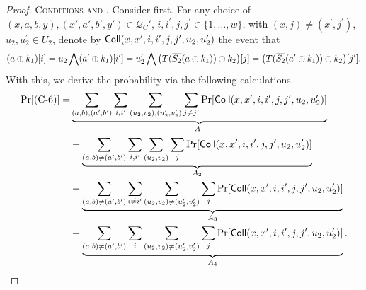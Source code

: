 \begin{proof}

%
%




\smallskip
\noindent\textsc{Conditions \csix and \cnine}. Consider \csix first. For any choice of $(x,a, b,y), (x',a', b',y') \in \mathcal{Q}_{C}'$, $i, i^{\prime},j, j^{\prime} \in\{1, \ldots, w\}$, with $(x, j) \neq \left(x^{\prime}, j^{\prime}\right)$, $u_{2}, u_{2}^{\prime} \in U_{2}$, denote by $\mathsf{Coll}(x,x',i,i',j,j',u_2,u_2')$ the event that
%
%
$$(a \oplus k_1)[i] = u_2\bigwedge(a' \oplus k_1)[i'] = u_2'\bigwedge\big(T(\overline{S_2}(a\oplus k_1))\oplus k_2\big)[j]=\big(T(\overline{S_2}(a'\oplus k_1))\oplus k_2\big)[j'].
$$
%
%
With this, we derive the probability via the following calculations.
%
%
\begin{align*}
\Pr[\text{(C-6)}]  
=   &  \underbrace{\sum_{(a,b),(a',b')}\sum_{i,i'}\sum_{(u_2,v_2),(u_2',v_2')}\sum_{j\neq j'}\Pr[\mathsf{Coll}(x,x',i,i',j,j',u_2,u_2')]}_{A_1}    \\
&  + \underbrace{\sum_{(a,b)\neq(a',b')}\sum_{i,i'}\sum_{(u_2,v_2)}\sum_{j}\Pr[\mathsf{Coll}(x,x',i,i',j,j',u_2,u_2')]}_{A_2}      \\
&  +  \underbrace{\sum_{(a,b)\neq(a',b')}\sum_{i\neq i'}\sum_{(u_2,v_2)\neq(u_2',v_2')}\sum_{j}\Pr[\mathsf{Coll}(x,x',i,i',j,j',u_2,u_2')]}_{A_3}       \\
&  + \underbrace{\sum_{(a,b)\neq(a',b')}\sum_{i}\sum_{(u_2,v_2)\neq(u_2',v_2')}\sum_{j}\Pr[\mathsf{Coll}(x,x',i,i',j,j',u_2,u_2')]}_{A_4}   .
\end{align*}




\end{proof}
